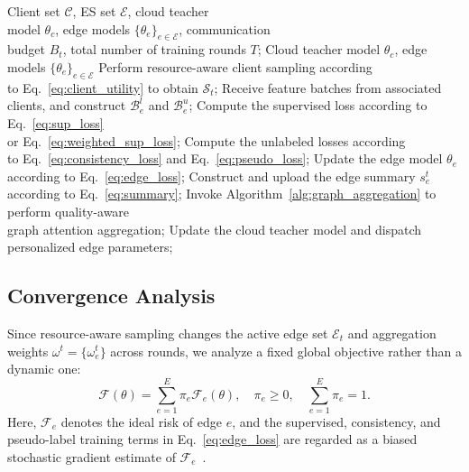 ﻿\documentclass[10pt, conference, letterpaper]{ IEEEtran}
\begin{document}
\begin{algorithm}[t]
\caption{Cloud-Edge-Client Collaborative Training Procedure of EdgeQGFed}
\label{alg:edgeqgfed}
\begin{algorithmic}[1]
\REQUIRE Client set $\mathcal{C}$, ES set $\mathcal{E}$, cloud teacher \\model $\theta_c$, edge models $\{\theta_e\}_{e\in\mathcal{E}}$, communication \\budget $B_t$, total number of training rounds $T$;
\ENSURE Cloud teacher model $\theta_c$, edge models $\{\theta_e\}_{e\in\mathcal{E}}$
    \STATE Perform resource-aware client sampling according \\to Eq.~\eqref{eq:client_utility} to obtain $\mathcal{S}_t$;
        \STATE Receive feature batches from associated clients, and construct $\mathcal{B}_e^l$ and $\mathcal{B}_e^u$;
        \STATE Compute the supervised loss according to Eq.~\eqref{eq:sup_loss} \\or Eq.~\eqref{eq:weighted_sup_loss};
        \STATE Compute the unlabeled losses according \\to Eq.~\eqref{eq:consistency_loss} and Eq.~\eqref{eq:pseudo_loss};
        \STATE Update the edge model $\theta_e$ according to Eq.~\eqref{eq:edge_loss};
            \STATE Construct and upload the edge summary $s_e^t$ according to Eq.~\eqref{eq:summary};
        \ENDIF
    \ENDFOR
        \STATE Invoke Algorithm~\ref{alg:graph_aggregation} to perform quality-aware \\graph attention aggregation;
        \STATE Update the cloud teacher model and dispatch personalized edge parameters;
    \ENDIF
\ENDFOR
\end{algorithmic}
\end{algorithm}

\subsection{Convergence Analysis}
\label{subsec:convergence}
Since resource-aware sampling changes the active edge set $\mathcal{E}_t$ and aggregation weights $\omega^t=\{\omega_e^t\}$ across rounds, we analyze a fixed global objective rather than a dynamic one:
\begin{equation}
    \mathcal{F}(\theta)=\sum_{e=1}^{E}\pi_e\mathcal{F}_e(\theta),
    \quad \pi_e\ge0,\quad \sum_{e=1}^{E}\pi_e=1 .
    \label{eq:fixed_global_objective}
\end{equation}
Here, $\mathcal{F}_e$ denotes the ideal risk of edge $e$, and the supervised, consistency, and pseudo-label training terms in Eq.~\eqref{eq:edge_loss} are regarded as a biased stochastic gradient estimate of $\mathcal{F}_e$~\cite{mcmahan2017communication, li2020federated}.
\end{document}
